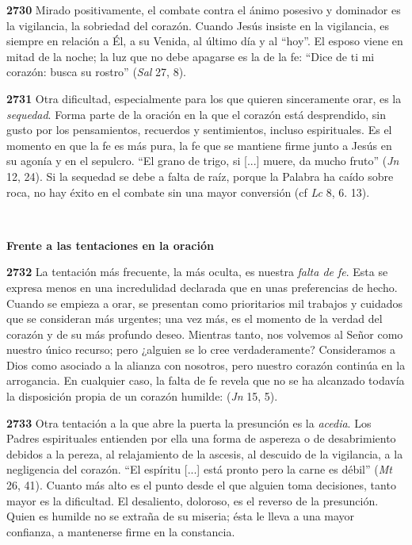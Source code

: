 \textbf{2730} Mirado positivamente, el combate contra el ánimo posesivo y dominador es la vigilancia, la sobriedad del corazón. Cuando Jesús insiste en la vigilancia, es siempre en relación a Él, a su Venida, al último día y al ``hoy''. El esposo viene en mitad de la noche; la luz que no debe apagarse es la de la fe: ``Dice de ti mi corazón: busca su rostro'' (\emph{Sal} 27, 8).

\textbf{2731} Otra dificultad, especialmente para los que quieren sinceramente orar, es la \emph{sequedad}. Forma parte de la oración en la que el corazón está desprendido, sin gusto por los pensamientos, recuerdos y sentimientos, incluso espirituales. Es el momento en que la fe es más pura, la fe que se mantiene firme junto a Jesús en su agonía y en el sepulcro. ``El grano de trigo, si {[}...{]} muere, da mucho fruto'' (\emph{Jn} 12, 24). Si la sequedad se debe a falta de raíz, porque la Palabra ha caído sobre roca, no hay éxito en el combate sin una mayor conversión (cf \emph{Lc} 8, 6. 13).

\textbf{\\ }

\textbf{Frente a las tentaciones en la oración}

\textbf{2732} La tentación más frecuente, la más oculta, es nuestra \emph{falta de fe}. Esta se expresa menos en una incredulidad declarada que en unas preferencias de hecho. Cuando se empieza a orar, se presentan como prioritarios mil trabajos y cuidados que se consideran más urgentes; una vez más, es el momento de la verdad del corazón y de su más profundo deseo. Mientras tanto, nos volvemos al Señor como nuestro único recurso; pero ¿alguien se lo cree verdaderamente? Consideramos a Dios como asociado a la alianza con nosotros, pero nuestro corazón continúa en la arrogancia. En cualquier caso, la falta de fe revela que no se ha alcanzado todavía la disposición propia de un corazón humilde:  (\emph{Jn} 15, 5).

\textbf{2733} Otra tentación a la que abre la puerta la presunción es la \emph{acedia}. Los Padres espirituales entienden por ella una forma de aspereza o de desabrimiento debidos a la pereza, al relajamiento de la ascesis, al descuido de la vigilancia, a la negligencia del corazón. ``El espíritu {[}...{]} está pronto pero la carne es débil'' (\emph{Mt} 26, 41). Cuanto más alto es el punto desde el que alguien toma decisiones, tanto mayor es la dificultad. El desaliento, doloroso, es el reverso de la presunción. Quien es humilde no se extraña de su miseria; ésta le lleva a una mayor confianza, a mantenerse firme en la constancia.



